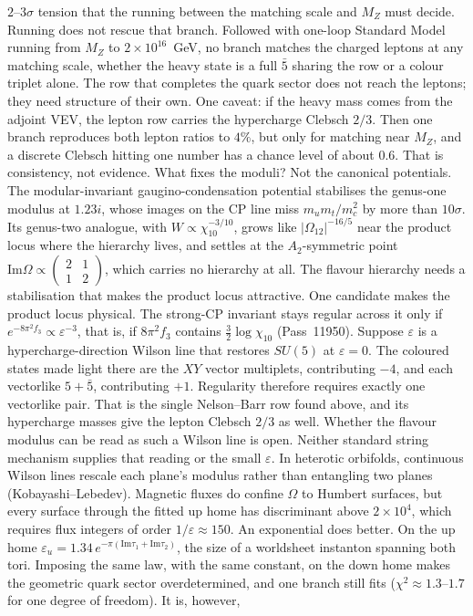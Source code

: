 $2$--$3\sigma$ tension that the running between the matching scale and $M_Z$ must decide.  Running does not rescue that branch. Followed with one-loop Standard Model running from $M_Z$ to $2\times10^{16}$~GeV, no branch matches the charged leptons at any matching scale, whether the heavy state is a full $\bar5$ sharing the row or a colour triplet alone. The row that completes the quark sector does not reach the leptons; they need structure of their own.  One caveat: if the heavy mass comes from the adjoint VEV, the lepton row carries the hypercharge Clebsch $2/3$. Then one branch reproduces both lepton ratios to $4\%$, but only for matching near $M_Z$, and a discrete Clebsch hitting one number has a chance level of about $0.6$. That is consistency, not evidence.  What fixes the moduli? Not the canonical potentials. The modular-invariant gaugino-condensation potential stabilises the genus-one modulus at $1.23i$, whose images on the CP line miss $m_um_t/m_c^2$ by more than $10\sigma$. Its genus-two analogue, with $W\propto\chi_{10}^{-3/10}$, grows like $|\Omega_{12}|^{-16/5}$ near the product locus where the hierarchy lives, and settles at the $A_2$-symmetric point $\mathrm{Im}\Omega\propto(\begin{smallmatrix}2&1\\1&2\end{smallmatrix})$, which carries no hierarchy at all. The flavour hierarchy needs a stabilisation that makes the product locus attractive.  One candidate makes the product locus physical. The strong-CP invariant stays regular across it only if $e^{-8\pi^2f_3}\propto\varepsilon^{-3}$, that is, if $8\pi^2f_3$ contains $\tfrac32\log\chi_{10}$ (Pass~11950). Suppose $\varepsilon$ is a hypercharge-direction Wilson line that restores $SU(5)$ at $\varepsilon=0$. The coloured states made light there are the $XY$ vector multiplets, contributing $-4$, and each vectorlike $5+\bar5$, contributing $+1$. Regularity therefore requires exactly one vectorlike pair. That is the single Nelson--Barr row found above, and its hypercharge masses give the lepton Clebsch $2/3$ as well. Whether the flavour modulus can be read as such a Wilson line is open.  Neither standard string mechanism supplies that reading or the small $\varepsilon$. In heterotic orbifolds, continuous Wilson lines rescale each plane's modulus rather than entangling two planes (Kobayashi--Lebedev). Magnetic fluxes do confine $\Omega$ to Humbert surfaces, but every surface through the fitted up home has discriminant above $2\times10^4$, which requires flux integers of order $1/\varepsilon\approx150$.  An exponential does better. On the up home $\varepsilon_u=1.34\,e^{-\pi(\mathrm{Im}\tau_1+\mathrm{Im}\tau_2)}$, the size of a worldsheet instanton spanning both tori. Imposing the same law, with the same constant, on the down home makes the geometric quark sector overdetermined, and one branch still fits ($\chi^2\approx1.3$--$1.7$ for one degree of freedom). It is, however, 